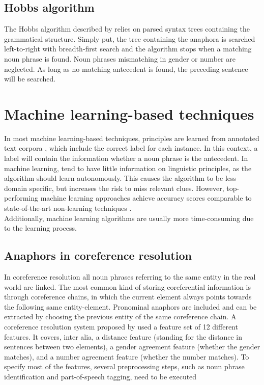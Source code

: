 \subsection{Hobbs algorithm}
The Hobbs algorithm described by \citep{hobbs1978resolving} relies on parsed syntax trees containing the grammatical structure. Simply put, the tree containing the anaphora is searched left-to-right with breadth-first search and the algorithm stops when a matching noun phrase is found. Noun phrases mismatching in gender or number are neglected. As long as no matching antecedent is found, the preceding sentence will be searched.

\section{Machine learning-based techniques}

In most machine learning-based techniques, principles are learned from annotated text corpora  \citep{soon2001machine, bergsma2005automatic}, which include the correct label for each instance. In this context, a label will contain the information whether a noun phrase is the antecedent. In machine learning, tend to have little information on linguistic principles, as the algorithm should learn autonomously. This causes the algorithm to be less domain specific, but increases the risk to miss relevant clues. However, top-performing machine learning approaches achieve accuracy scores comparable to state-of-the-art non-learning techniques \citep{soon2001machine}. \\
Additionally, machine learning algorithms are usually more time-consuming due to the learning process.

\subsection{Anaphors in coreference resolution}
\label{soon2001traininginstances}
In coreference resolution all noun phrases referring to the same entity in the real world are linked. The most common kind of storing coreferential information is through coreference chains, in which the current element always points towards the following same entity-element. Pronominal anaphors are included and can be extracted by choosing the previous entity of the same coreference chain. 
A coreference resolution system proposed by \citep{soon2001machine} used a feature set of 12 different features. It covers, inter alia, a distance feature (standing for the distance in sentences between two elements), a gender agreement feature (whether the gender matches), and a number agreement feature (whether the number matches). To specify most of the features, several preprocessing steps, such as noun phrase identification and part-of-speech tagging,  need to be executed 


